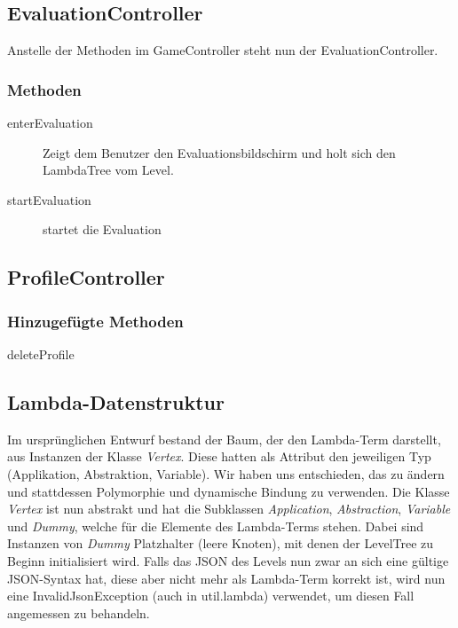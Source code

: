 \documentclass[parskip=full]{scrreprt}
\begin{document}
\subsection{EvaluationController}
Anstelle der Methoden im GameController steht nun der EvaluationController.
	\subsubsection{Methoden}
	\begin{description} 
		\item[enterEvaluation] Zeigt dem Benutzer den Evaluationsbildschirm und holt sich den LambdaTree vom Level.
		\item[startEvaluation] startet die Evaluation
	\end{description}


\subsection{ProfileController}

\subsubsection{Hinzugefügte Methoden}
\begin{description}
	\item[deleteProfile]
\end{description}


\subsection{Lambda-Datenstruktur}

Im ursprünglichen Entwurf bestand der Baum, der den Lambda-Term darstellt, aus Instanzen der Klasse \textit{Vertex}. Diese hatten als Attribut den jeweiligen Typ (Applikation, Abstraktion, Variable). Wir haben uns entschieden, das zu ändern und stattdessen Polymorphie und dynamische Bindung zu verwenden. Die Klasse \textit{Vertex} ist nun abstrakt und hat die Subklassen \textit{Application}, \textit{Abstraction}, \textit{Variable} und \textit{Dummy}, welche für die Elemente des Lambda-Terms stehen. Dabei sind Instanzen von \textit{Dummy} Platzhalter (leere Knoten), mit denen der LevelTree zu Beginn initialisiert wird.
Falls das JSON des Levels nun zwar an sich eine gültige JSON-Syntax hat, diese aber nicht mehr als Lambda-Term korrekt ist, wird nun eine InvalidJsonException (auch in util.lambda) verwendet, um diesen Fall angemessen zu behandeln.
\end{document}
